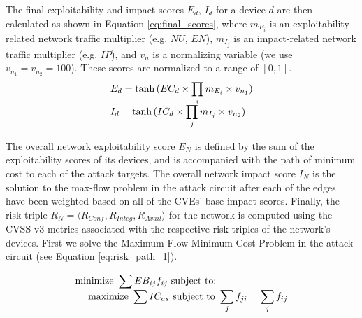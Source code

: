 
The final exploitability and impact scores $E_d$, $I_d$ for a device $d$ are then calculated as shown in Equation \ref{eq:final_scores}, where $m_{E_i}$ is an exploitability-related network traffic multiplier (e.g. $NU$, $EN$), $m_{I_j}$ is an impact-related network traffic multiplier (e.g. $IP$), and $v_{n}$ is a normalizing variable (we use $v_{n_1}=v_{n_2}=100$). These scores are normalized to a range of $[0,1]$.
\begin{equation}
\begin{array}{ll@{}ll}
E_d = \tanh{(EC_d \times \displaystyle\prod_i m_{E_i} \times v_{n_1})} \\
I_d = \tanh{(IC_d \times \displaystyle\prod_j m_{I_j} \times v_{n_2})} \\
\end{array}
\label{eq:final_scores}
\end{equation}

The overall network exploitability score $E_N$ is defined by the sum of the exploitability scores of its devices, and is accompanied with the path of minimum cost to each of the attack targets. The overall network impact score $I_N$ is the solution to the max-flow problem in the attack circuit after each of the edges have been weighted based on all of the CVEs' base impact scores. Finally, the risk triple $R_N = \langle R_{Conf}, R_{Integ}, R_{Avail} \rangle$ for the network is computed using the CVSS v3 metrics associated with the respective risk triples of the network's devices. First we solve the Maximum Flow Minimum Cost Problem in the attack circuit (see Equation \ref{eq:risk_path_1}). 

\begin{equation}
\begin{array}{ll@{}ll}
\text{minimize } \displaystyle\sum EB_{ij}f_{ij}
\text{ subject to: } \\
\ \ \ \ \text{maximize } \displaystyle\sum\limits_{} IC_{as} \text{ subject to } \displaystyle\sum\limits_{j} f_{ji} = \displaystyle\sum\limits_{j} f_{ij}
\end{array}
\label{eq:risk_path_1}
\end{equation}

